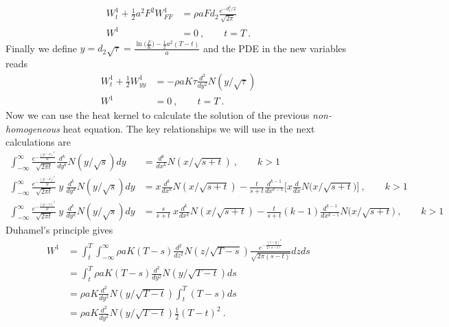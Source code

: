 \documentclass[10pt]{article}
\numberwithin{equation}{section}
\begin{document}
\begin{equation}\label{order_1}
	\begin{split}
	W_t^{1} + \frac{1}{2}  a^2 F^2 W_{FF}^{1} &=\rho a  F d_2 \frac{e^{-d_1^2 / 2}}{\sqrt{2\pi}}\\
	W^{1}&=0\:,\qquad t=T\:.
	\end{split}
\end{equation}
Finally we define $y=d_2 \sqrt{\tau} = \frac{ \ln\bigl( \frac{F}{K}\bigr) - \frac{1}{2} a^2 (T-t)}{a}$ and the PDE in the new variables reads
\begin{equation}\label{order_1}
	\begin{split}
	W_t^{1} + \frac{1}{2}  W_{yy}^{1}&= -\rho a K \tau \frac{d^2}{dy^2}N(y/\sqrt{\tau}) \\
	W^{1}&=0\:,\qquad t=T\:.
	\end{split}
\end{equation}
Now we can use the heat kernel to calculate the solution of the previous \emph{non-homogeneous} heat equation. The key relationships we will use in the next calculations are
\begin{equation}\label{heat_kernel}
	\begin{split}
	\int_{-\infty}^{\infty}\frac{e^{-\frac{(y-x)^2}{2 t}}}{\sqrt{2\pi t}} \frac{d^k}{dy^k} N(y/\sqrt{s})dy&=\frac{d^k}{dx^k} N(x/\sqrt{s+t}) \:, \qquad k>1\\
	\int_{-\infty}^{\infty}\frac{e^{-\frac{(y-x)^2}{2 t}}}{\sqrt{2\pi t}} \:y\:\frac{d^k}{dy^k} N(y/\sqrt{s})dy&=x \frac{d^k}{dx^k} N(x/\sqrt{s+t}) -\frac{t}{s+t} \frac{d^{k-1}}{dx^{k-1}}\biggl[ x \frac{d}{dx}N \bigl( x/\sqrt{s+t}\bigr)\biggr]\:, \qquad k>1\\
	\int_{-\infty}^{\infty}\frac{e^{-\frac{(y-x)^2}{2 t}}}{\sqrt{2\pi t}} \:y\:\frac{d^k}{dy^k} N(y/\sqrt{s})dy&=\frac{s}{s+t}\:x \frac{d^k}{dx^k} N(x/\sqrt{s+t}) -\frac{t}{s+t}(k-1) \frac{d^{k-1}}{dx^{k-1}}N \bigl( x/\sqrt{s+t}\bigr)\:, \qquad k>1
	\end{split}
\end{equation}
Duhamel's principle gives
\begin{equation*}
	\begin{split}
	W^{1}&=\int_{t}^{T}\int_{-\infty}^{\infty} \rho a K (T-s) \frac{d^2}{dz^2}N(z/\sqrt{T-s}) \frac{e^{-\frac{(z-y)^2}{2 (s-t)}}}{\sqrt{2\pi (s-t)}} dz ds\\
	&=\int_{t}^{T} \rho a K (T-s) \frac{d^2}{dy^2}N(y/\sqrt{T-t})ds\\
	&=\rho a K \frac{d^2}{dy^2}N(y/\sqrt{T-t})\int_{t}^{T}  (T-s) ds\\
	&=\rho a K \frac{d^2}{dy^2}N(y/\sqrt{T-t})\frac{1}{2}(T-t)^2\:.
	\end{split}
\end{equation*}
\end{document}
